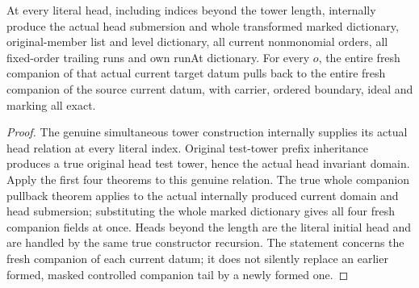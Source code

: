\begin{theorem}
\label{hir:submersion-history-all-heads}
\leanok
At every literal head, including indices beyond the tower length, internally
produce the actual head submersion and whole transformed marked dictionary,
original-member list and level dictionary, all current nonmonomial orders,
all fixed-order trailing runs and own runAt dictionary. For every $o$, the
entire fresh companion of that actual current target datum pulls back to
the entire fresh companion of the source current datum, with carrier,
ordered boundary, ideal and marking all exact.
\end{theorem}
\begin{proof}
The genuine simultaneous tower construction internally supplies its actual
head relation at every literal index. Original test-tower prefix inheritance
produces a true original head test tower, hence the actual head invariant
domain. Apply the first four theorems to this genuine relation. The true
whole companion pullback theorem applies to the actual internally produced
current domain and head submersion; substituting the whole marked dictionary
gives all four fresh companion fields at once. Heads beyond the length are
the literal initial head and are handled by the same true constructor
recursion. The statement concerns the fresh companion of each current datum;
it does not silently replace an earlier formed, masked controlled companion
tail by a newly formed one.
\end{proof}

